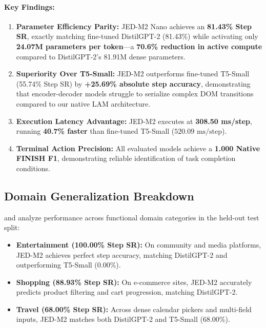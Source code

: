 \documentclass[10pt,twocolumn,letterpaper]{article}
\begin{document}
\paragraph{Key Findings:}
\begin{enumerate}[leftmargin=*]
    \item \textbf{Parameter Efficiency Parity:} JED-M2 Nano achieves an \textbf{81.43\% Step SR}, exactly matching fine-tuned DistilGPT-2 (81.43\%) while activating only \textbf{24.07M parameters per token}---a \textbf{70.6\% reduction in active compute} compared to DistilGPT-2's 81.91M dense parameters.
    \item \textbf{Superiority Over T5-Small:} JED-M2 outperforms fine-tuned T5-Small (55.74\% Step SR) by \textbf{+25.69\% absolute step accuracy}, demonstrating that encoder-decoder models struggle to serialize complex DOM transitions compared to our native LAM architecture.
    \item \textbf{Execution Latency Advantage:} JED-M2 executes at \textbf{308.50 ms/step}, running \textbf{40.7\% faster} than fine-tuned T5-Small ($520.09\text{ ms/step}$).
    \item \textbf{Terminal Action Precision:} All evaluated models achieve a \textbf{1.000 Native FINISH F1}, demonstrating reliable identification of task completion conditions.
\end{enumerate}

\subsection{Domain Generalization Breakdown}

 and  analyze performance across functional domain categories in the held-out test split:
\begin{itemize}[leftmargin=*]
    \item \textbf{Entertainment (100.00\% Step SR):} On community and media platforms, JED-M2 achieves perfect step accuracy, matching DistilGPT-2 and outperforming T5-Small (0.00\%).
    \item \textbf{Shopping (88.93\% Step SR):} On e-commerce sites, JED-M2 accurately predicts product filtering and cart progression, matching DistilGPT-2.
    \item \textbf{Travel (68.00\% Step SR):} Across dense calendar pickers and multi-field inputs, JED-M2 matches both DistilGPT-2 and T5-Small (68.00\%).
\end{itemize}
\end{document}
